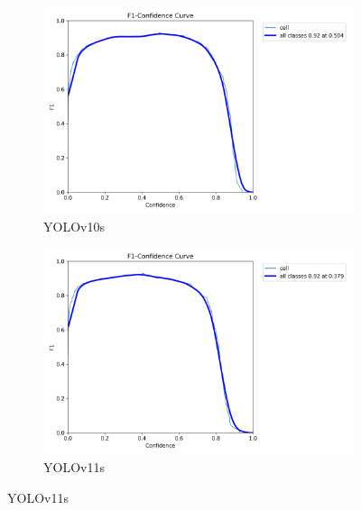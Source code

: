 \documentclass[12pt,a4paper,onecolumn,oneside]{report}
\begin{document}
\begin{figure}[H]
  \vspace{0.5cm}
  \begin{subfigure}[b]{0.48\textwidth}
    \centering
    \includegraphics[width=\textwidth]{figuras/resultados experimentacion/yolov10s/test2/BoxF1_curve.png}
    \caption{YOLOv10s}
    \label{fig:yolov10s_test2}
  \end{subfigure}
  \hfill
  \begin{subfigure}[b]{0.48\textwidth}
    \centering
    \includegraphics[width=\textwidth]{figuras/resultados experimentacion/yolov11s/test2/BoxF1_curve.png}
    \caption{YOLOv11s}
    \label{fig:yolov11s_test2}
  \end{subfigure}
  

\end{figure}
\end{document}
